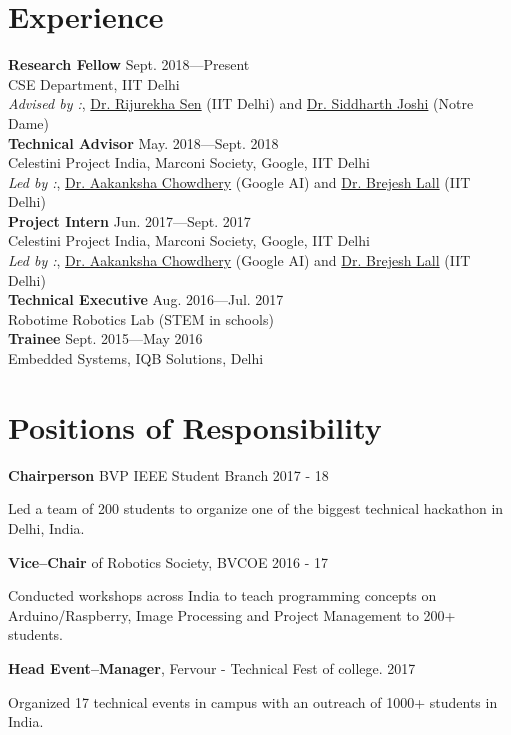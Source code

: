 \section{Experience}
\textbf{Research Fellow} \hfill {Sept. 2018---Present}\\
CSE Department, IIT Delhi\\
\emph{Advised by :}, \href{http://www.cse.iitd.ernet.in/~rijurekha/index.html}{Dr. Rijurekha Sen} (IIT Delhi) and \href{http://isn.ucsd.edu/~siddharth/}{Dr. Siddharth Joshi} (Notre Dame)\\
\textbf{Technical Advisor} \hfill {May. 2018---Sept. 2018}\\
Celestini Project India, Marconi Society, Google, IIT Delhi\\
\emph{Led by :}, \href{http://www.achowdhery.com/}{Dr. Aakanksha Chowdhery} (Google AI) and \href{http://ee.iitd.ernet.in/people/brijeshlall.html}{Dr. Brejesh Lall} (IIT Delhi)\\
\textbf{Project Intern} \hfill {Jun. 2017---Sept. 2017}\\
Celestini Project India, Marconi Society, Google, IIT Delhi\\
\emph{Led by :}, \href{http://www.achowdhery.com/}{Dr. Aakanksha Chowdhery} (Google AI) and \href{http://ee.iitd.ernet.in/people/brijeshlall.html}{Dr. Brejesh Lall} (IIT Delhi)\\
\textbf{Technical Executive} \hfill {Aug. 2016---Jul. 2017}\\
Robotime Robotics Lab (STEM in schools)\\
\textbf{Trainee} \hfill {Sept. 2015---May 2016}\\
Embedded Systems, IQB Solutions, Delhi

\section{Positions of Responsibility}
\textbf{Chairperson} BVP IEEE Student Branch \hfill {2017 - 18}
\begin{innerlist}
\item Led a team of 200 students to organize one of the biggest technical hackathon in Delhi, India.
\end{innerlist}
\textbf{Vice--Chair} of Robotics Society, BVCOE \hfill {2016 - 17}
\begin{innerlist}
\item Conducted workshops across India to teach programming concepts on Arduino/Raspberry, Image Processing and Project Management to 200+ students.
\end{innerlist}
\textbf{Head Event--Manager}, Fervour - Technical Fest of college. \hfill {2017}
\begin{innerlist}
\item Organized 17 technical events in campus with an outreach of 1000+ students in India.
\end{innerlist}

